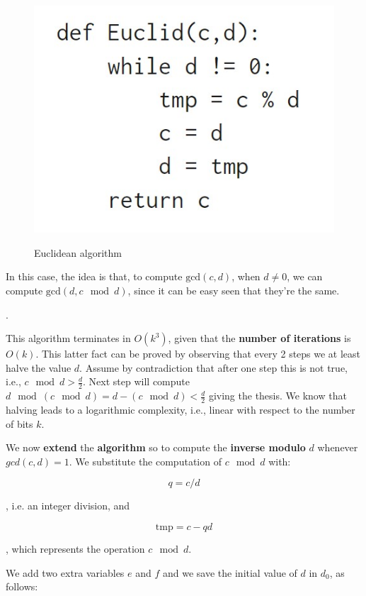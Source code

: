 \begin{figure}[h!]
        \centering
        \includegraphics[scale = 0.9]{img/eu1.jpg}
        \label{eu1}
        \caption{Euclidean algorithm}
\end{figure}

In this case, the idea is that, to compute $\text{gcd}(c,d)$, when $d \neq 0$, we can compute $\text{gcd}(d,c \mod d)$, since it can be easy seen that they're the same.

.

This algorithm terminates in $O(k^3)$, given that the \textbf{number of iterations} is $O(k)$. This latter fact can be proved by observing that every 2 steps we at least halve the value $d$. Assume by contradiction that after one step this is not true, i.e., $c \mod d > \frac{d}{2}$. Next step will compute $d \mod (c \mod d) = d - (c \mod d) < \frac{d}{2}$ giving the thesis. We know that halving leads to a logarithmic complexity, i.e., linear with respect to the number of bits $k$.

We now \textbf{extend} the \textbf{algorithm} so to compute the \textbf{inverse modulo} $d$ whenever $gcd(c,d)=1$. We substitute the computation of $c\mod d$ with:

$$
q = c/d
$$

, i.e. an integer division, and

$$
\text{tmp} = c - qd
$$

, which represents the operation $c \mod d$.


We add two extra variables $e$ and $f$ and we save the initial value of $d$ in $d_0$, as follows:

